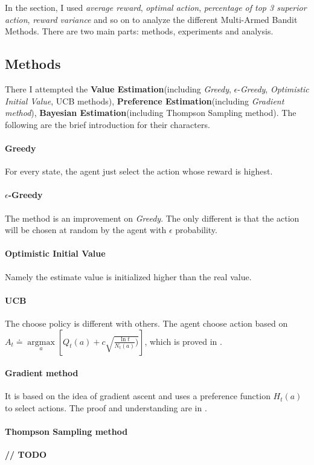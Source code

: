 \documentclass[12pt]{article}
\begin{document}
In the section, I used \textit{average reward}, \textit{optimal action}, \textit{percentage of top 3 superior action}, \textit{reward variance} and so on to analyze the different Multi-Armed Bandit Methods. There are two main parts: methods, experiments and analysis.
\subsection{Methods}
There I attempted the \textbf{Value Estimation}(including \textit{Greedy}, $\epsilon$-\textit{Greedy}, \textit{Optimistic Initial Value}, UCB methods), \textbf{Preference Estimation}(including \textit{Gradient method}), \textbf{Bayesian Estimation}(including Thompson Sampling method). The following are the brief introduction for their characters.

\paragraph*{Greedy} For every state, the agent just select the action whose reward is highest.
\paragraph*{$\epsilon$-Greedy} The method is an improvement on \textit{Greedy}. The only different is that the action will be chosen at random by the agent with $\epsilon$ probability. 
\paragraph*{Optimistic Initial Value}Namely the estimate value is initialized higher than the real value.
\paragraph*{UCB} The choose policy is different with others. The agent choose action based on $A_t \doteq \mathop{argmax}\limits_{a}\left [Q_t(a)+c\sqrt{\frac{\ln{t}}{N_t(a)})}  \right ] $, which is proved in .
\paragraph*{Gradient method} It is based on the idea of gradient ascent and uses a preference function $H_t(a)$ to select actions. The proof and understanding are in .
\paragraph*{Thompson Sampling method} \textbf{// TODO}
\end{document}
